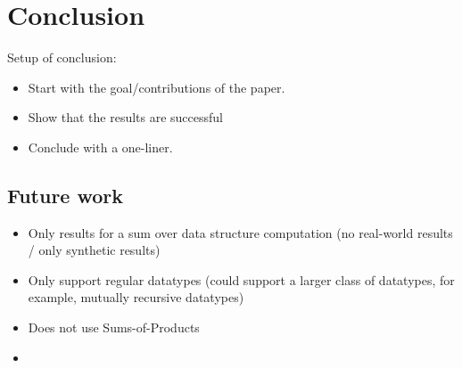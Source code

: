 \chapter{Conclusion}




Setup of conclusion:
\begin{itemize}
  \item Start with the goal/contributions of the paper.
  \item Show that the results are successful
  \item Conclude with a one-liner.
\end{itemize}

\section{Future work}

\begin{itemize}
  \item Only results for a sum over data structure computation (no real-world results / only synthetic results)
  \item Only support regular datatypes (could support a larger class of datatypes, for example, mutually recursive datatypes)
  \item Does not use Sums-of-Products
  \item 
\end{itemize}